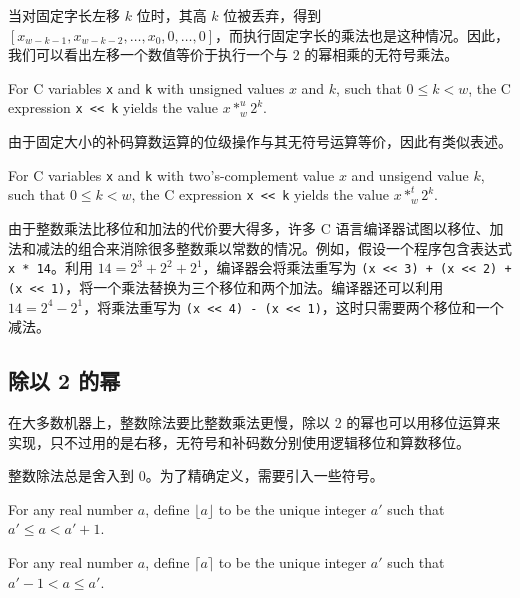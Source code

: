 当对固定字长左移 $k$ 位时，其高 $k$ 位被丢弃，得到 $[x_{w-k-1}, x_{w-k-2}, \dots, x_0, 0, \dots, 0]$，而执行固定字长的乘法也是这种情况。因此，我们可以看出左移一个数值等价于执行一个与 $2$ 的幂相乘的无符号乘法。

\begin{theorem}
    For C variables \verb|x| and \verb|k| with unsigned values $x$ and $k$, such that $0 \leq k < w$, the C expression \verb|x << k| yields the value $x *^u_w 2^k$.
\end{theorem}

由于固定大小的补码算数运算的位级操作与其无符号运算等价，因此有类似表述。

\begin{theorem}
    For C variables \verb|x| and \verb|k| with two's-complement value $x$ and unsigend value $k$, such that $0 \leq k < w$, the C expression \verb|x << k| yields the value $x *^t_w 2^k$.
\end{theorem}

由于整数乘法比移位和加法的代价要大得多，许多 C 语言编译器试图以移位、加法和减法的组合来消除很多整数乘以常数的情况。例如，假设一个程序包含表达式 \verb|x * 14|。利用 $14 = 2^3 + 2^2 + 2^1$，编译器会将乘法重写为 \verb|(x << 3) + (x << 2) + (x << 1)|，将一个乘法替换为三个移位和两个加法。编译器还可以利用 $14 = 2^4 - 2^1$，将乘法重写为 \verb|(x << 4) - (x << 1)|，这时只需要两个移位和一个减法。

\subsection{除以 2 的幂}

在大多数机器上，整数除法要比整数乘法更慢，除以 2 的幂也可以用移位运算来实现，只不过用的是右移，无符号和补码数分别使用逻辑移位和算数移位。

整数除法总是舍入到 0。为了精确定义，需要引入一些符号。

\begin{definition}
    For any real number $a$, define $\lfloor a \rfloor$ to be the unique integer $a'$ such that $a' \leq a < a' + 1$.
\end{definition}

\begin{definition}
    For any real number $a$, define $\lceil a \rceil$ to be the unique integer $a'$ such that $a' - 1 < a \leq a'$.
\end{definition}


